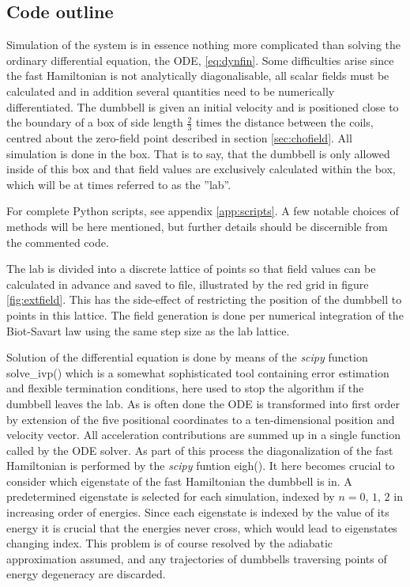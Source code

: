 \documentclass[main.tex]{subfiles}
\begin{document}
\subsection{Code outline}\label{sec:code}
Simulation of the system is in essence nothing more complicated than solving the
ordinary differential equation, the ODE, \ref{eq:dynfin}. Some difficulties arise since the fast
Hamiltonian is not analytically diagonalisable, all scalar fields must be calculated and in
addition several quantities need to be numerically differentiated. The dumbbell is given an
initial velocity and is positioned close to the boundary of a box of side length \(\frac{2}{3}\) times the
distance between the coils, centred about the zero-field point described in section
\ref{sec:chofield}. All simulation is done in the box. That is to say, that the dumbbell is
only allowed inside of this box and that field values are exclusively calculated within the
box, which will be at times referred to as the ''lab''.

For complete Python scripts, see appendix \ref{app:scripts}. A few notable choices of
methods will be here mentioned, but further details should be discernible from the
commented code.

The lab is divided into a discrete lattice of points so that field values can be
calculated in advance and saved to file, illustrated by the red grid in figure
\ref{fig:extfield}. This has the side-effect of restricting the
position of the dumbbell to points in this lattice. The field generation is done per numerical
integration of the Biot-Savart law using the same step size as the lab lattice.

Solution of the differential equation is done by means of the \textit{scipy} function
solve\_ivp() which is a somewhat sophisticated tool containing error estimation and
flexible termination conditions, here used to stop the algorithm if the dumbbell leaves the
lab. As is often done the ODE is transformed into first order by extension of the
five positional coordinates to a ten-dimensional position and velocity vector. All
acceleration contributions are summed up in a single function called by the ODE solver. 
As part of this process the diagonalization of the fast Hamiltonian is performed by the
\textit{scipy} funtion eigh(). It here becomes crucial to consider which eigenstate of the
fast Hamiltonian the dumbbell is in. A predetermined eigenstate is selected for each
simulation, indexed by \(n = 0\), \(1\), \(2\) in increasing order of energies. Since each
eigenstate is indexed by the value of its energy it is crucial that the energies never
cross, which would lead to eigenstates changing index. This problem is of course resolved
by the adiabatic approximation assumed, and any trajectories of dumbbells traversing points
of energy degeneracy are discarded.
\end{document}
